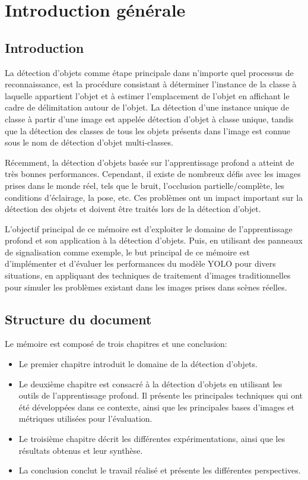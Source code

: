 \chapter*{Introduction générale}
\newpage
\pagestyle{fancy}
\fancyhead[L]{}
\renewcommand{\headrulewidth}{1pt}
\fancyfoot[C]{\thepage}


\section*{Introduction}
La détection d'objets comme étape principale dans n'importe quel processus  de reconnaissance, est la procédure consistant à déterminer l'instance de la classe à laquelle appartient l'objet et à estimer l'emplacement de l'objet en affichant le cadre de délimitation autour de l'objet. La détection d'une instance unique de classe à partir d'une image est appelée détection d'objet à classe unique, tandis que la détection des classes de tous les objets présents dans l'image est connue sous le nom de détection d'objet multi-classes. 

Récemment, la détection d'objets basée sur l'apprentissage profond a atteint de très bonnes performances. Cependant, il existe de nombreux défis avec les images prises dans le monde réel, tels que le bruit, l'occlusion partielle/complète, les conditions d'éclairage, la pose, etc. Ces problèmes ont un impact important sur la détection des objets et doivent être traités lors de la détection d'objet. 

L'objectif principal de ce mémoire est d'exploiter le domaine de l'apprentissage profond et son application à la détection d'objets. Puis, en utilisant des panneaux de signalisation comme exemple, le but principal de ce mémoire est d'implémenter et d'évaluer les performances du modèle YOLO pour divers situations, en appliquant des techniques de traitement d'images traditionnelles pour simuler les problèmes existant dans les images prises dans scènes réelles.

\section*{Structure du document}
Le mémoire est composé de trois chapitres et une conclusion:

\begin{itemize}
\item Le premier chapitre introduit le domaine de la détection d'objets.
\item Le deuxième chapitre est consacré à la détection d'objets en utilisant les outils de l'apprentissage profond. Il présente les principales techniques qui ont été développées dans ce contexte, ainsi que les principales bases d'images et métriques utilisées pour l'évaluation.
\item Le troisième chapitre décrit les différentes expérimentations, ainsi que les résultats obtenus et leur synthèse.
\item La conclusion conclut le travail réalisé et présente les différentes perspectives.
\end{itemize}